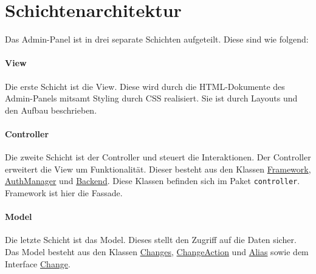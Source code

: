 \section{Schichtenarchitektur}

Das Admin-Panel ist in drei separate Schichten aufgeteilt. Diese sind wie folgend:

\paragraph*{View}
Die erste Schicht ist die View. Diese wird durch die HTML-Dokumente des Admin-Panels mitsamt Styling durch CSS realisiert.
Sie ist durch Layouts und den Aufbau beschrieben.

\paragraph*{Controller}
Die zweite Schicht ist der Controller und steuert die Interaktionen. Der Controller erweitert die View um Funktionalität. 
Dieser besteht aus den Klassen \hyperref[AP_Framework]{Framework}, \hyperref[AP_AuthManager]{AuthManager} und \hyperref[AP_Backend]{Backend}. 
Diese Klassen befinden sich im Paket \verb#controller#. Framework ist hier die Fassade.

\paragraph*{Model}
Die letzte Schicht ist das Model. Dieses stellt den Zugriff auf die Daten sicher.
Das Model besteht aus den Klassen \hyperref[AP_Changes]{Changes}, \hyperref[AP_ChangeAction]{ChangeAction} und \hyperref[AP_Alias]{Alias} sowie dem Interface \hyperref[AP_Change]{Change}.
